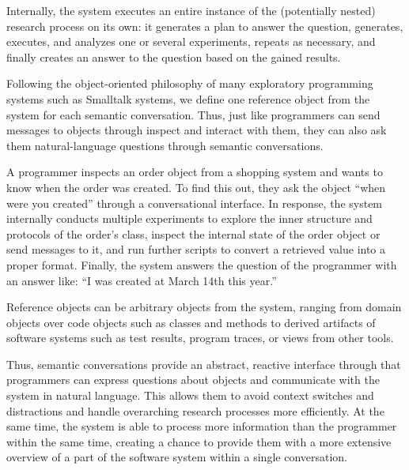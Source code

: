 Internally, the system executes an entire instance of the (potentially nested) research process on its own: it generates a plan to answer the question, generates, executes, and analyzes one or several experiments, repeats as necessary, and finally creates an answer to the question based on the gained results.

Following the object-oriented philosophy of many exploratory programming systems such as Smalltalk systems, we define one reference object from the system for each semantic conversation.
Thus, just like programmers can send messages to objects through inspect and interact with them, they can also ask them natural-language questions through semantic conversations.

\begin{example}
	A programmer inspects an order object from a shopping system and wants to know when the order was created.
	To find this out, they ask the object ``when were you created'' through a conversational interface.
	In response, the system internally conducts multiple experiments to explore the inner structure and protocols of the order's class, inspect the internal state of the order object or send messages to it, and run further scripts to convert a retrieved value into a proper format.
	Finally, the system answers the question of the programmer with an answer like: ``I was created at March 14th this year.''
\end{example}

Reference objects can be arbitrary objects from the system, ranging from domain objects over code objects such as classes and methods to derived artifacts of software systems such as test results, program traces, or views from other tools.

Thus, semantic conversations provide an abstract, reactive interface through that programmers can express questions about objects and communicate with the system in natural language.
This allows them to avoid context switches and distractions and handle overarching research processes more efficiently.
At the same time, the system is able to process more information than the programmer within the same time, creating a chance to provide them with a more extensive overview of a part of the software system within a single conversation.
